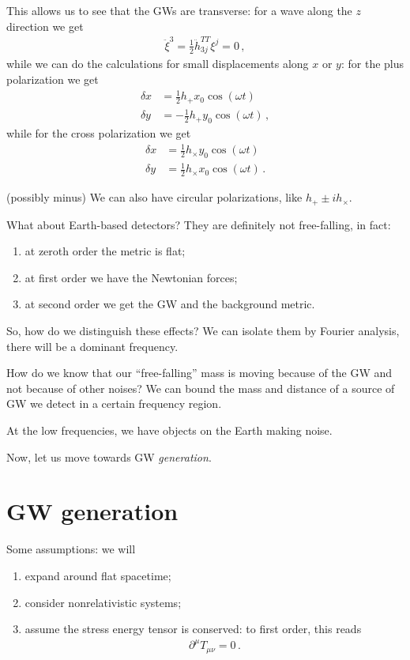 \documentclass[main.tex]{subfiles}
\begin{document}
This allows us to see that the GWs are transverse: for a wave along the \(z\) direction we get 
%
\begin{align}
\ddot{\xi}^{3} = \frac{1}{2} \ddot{h}_{3j}^{TT} \xi^{j} = 0
\,,
\end{align}
%
while we can do the calculations for small displacements along \(x\) or \(y\): for the plus polarization we get 
%
\begin{align}
  \delta x &= \frac{1}{2} h_{+} x_0 \cos(\omega t)  \\
  \delta y &= - \frac{1}{2} h_{+} y_0 \cos(\omega t)  
\,,
\end{align}
%
while for the cross polarization we get 
%
\begin{align}
\delta x &= \frac{1}{2} h_{ \times } y_0 \cos(\omega t)  \\
\delta y &= \frac{1}{2} h_{ \times } x_0 \cos(\omega t)  
\,.
\end{align}

(possibly minus)
We can also have circular polarizations, like \(h_+ \pm i h_{  \times }\). 

What about Earth-based detectors? 
They are definitely not free-falling, in fact: 
\begin{enumerate}
  \item at zeroth order the metric is flat;
  \item at first order we have the Newtonian forces;
  \item at second order we get the GW and the background metric.
\end{enumerate}

So, how do we distinguish these effects? We can isolate them by Fourier analysis, there will be a dominant frequency. 

How do we know that our ``free-falling'' mass is moving because of the GW and not because of other noises?
We can bound the mass and distance of a source of GW we detect in a certain frequency region. 

At the low frequencies, we have objects on the Earth making noise. 

Now, let us move towards GW \emph{generation}.

\chapter{GW generation}

Some assumptions: we will 
\begin{enumerate}
  \item expand around flat spacetime;
  \item consider nonrelativistic systems;
  \item assume the stress energy tensor is conserved: to first order, this reads 
  \begin{align}
  \partial^{\mu} T_{\mu \nu } = 0
  \,.
  \end{align}  
\end{enumerate}
\end{document}
